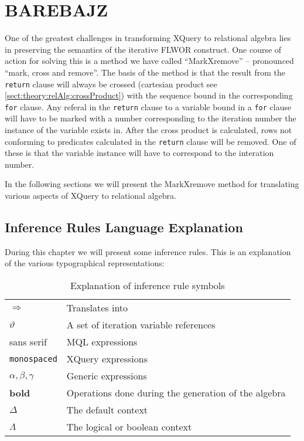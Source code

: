 \newpage
\section{BAREBAJZ}
\label{sect:translation:mXr}

One of the greatest challenges in transforming XQuery to relational algebra lies in preserving the semantics of
the iterative FLWOR construct. One course of action for solving this is a method we have called ``MarkXremove'' --
pronounced ``mark, cross and remove''. The basis of the method is that the result from the \texttt{return} clause
will always be crossed (cartesian product see \ref{sect:theory:relAlg:crossProduct}) with the sequence bound in the
corresponding \texttt{for} clause. Any referal in the \texttt{return} clause to a variable bound in a \texttt{for}
clause will have to be marked with a number corresponding to the iteration number the instance of the variable
exists in. After the cross product is calculated, rows not conforming to predicates calculated in the
\texttt{return} clause will be removed. One of these is that the variable instance will have to correspond to the
interation number.

In the following sections we will present the MarkXremove method for translating various aspects of XQuery to
relational algebra.

\subsection{Inference Rules Language Explanation}
\label{sect:translation:inferenceExplanation}
During this chapter we will present some inference rules. This is an explanation
of the various typographical representations:

\begin{table}[h]


\begin{tabular}{l|l}

  $\Longrightarrow$  & Translates into \\
  $\vartheta$ & A set of iteration variable references \\
  \textsf{sans serif} & MQL expressions \\
  \texttt{monospaced} & XQuery expressions \\
  $\alpha , \beta, \gamma$ & Generic expressions \\
  \textbf{bold} & Operations done during the generation of the algebra \\
  $\Delta$ & The default context \\
  $\Lambda$ & The logical or boolean context \\
  
\end{tabular}
\caption{Explanation of inference rule symbols}
\label{tab:translation:inferenceRuleSymbols}
\end{table}

